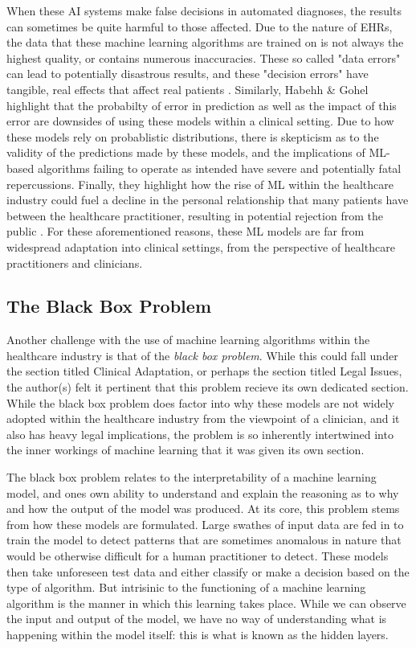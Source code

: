 \documentclass[a4paper]{article}
\begin{document}
When these AI systems make false decisions in automated diagnoses, the results can sometimes be quite harmful to those affected. Due to the nature of EHRs, the data that these machine learning algorithms are trained on is not always the highest quality, or contains numerous inaccuracies. These so called "data errors" can lead to potentially disastrous results, and these "decision errors" have tangible, real effects that affect real patients \cite{Ali_2023}. Similarly, Habehh \& Gohel highlight that the probabilty of error in prediction as well as the impact of this error are downsides of using these models within a clinical setting. Due to how these models rely on probablistic distributions, there is skepticism as to the validity of the predictions made by these models, and the implications of ML-based algorithms failing to operate as intended have severe and potentially fatal repercussions. Finally, they highlight how the rise of ML within the healthcare industry could fuel a decline in the personal relationship that many patients have between the healthcare practitioner, resulting in potential rejection from the public \cite{Habehh_2021}. For these aforementioned reasons, these ML models are far from widespread adaptation into clinical settings, from the perspective of healthcare practitioners and clinicians. 

\subsection{The Black Box Problem}

Another challenge with the use of machine learning algorithms within the healthcare industry is that of the \textit{black box problem}. While this could fall under the section titled Clinical Adaptation, or perhaps the section titled Legal Issues, the author(s) felt it pertinent that this problem recieve its own dedicated section. While the black box problem does factor into why these models are not widely adopted within the healthcare industry from the viewpoint of a clinician, and it also has heavy legal implications, the problem is so inherently intertwined into the inner workings of machine learning that it was given its own section. 

The black box problem relates to the interpretability of a machine learning model, and ones own ability to understand and explain the reasoning as to why and how the output of the model was produced. At its core, this problem stems from how these models are formulated. Large swathes of input data are fed in to train the model to detect patterns that are sometimes anomalous in nature that would be otherwise difficult for a human practitioner to detect. These models then take unforeseen test data and either classify or make a decision based on the type of algorithm. But intrisinic to the functioning of a machine learning algorithm is the manner in which this learning takes place. While we can observe the input and output of the model, we have no way of understanding what is happening within the model itself: this is what is known as the hidden layers. 
\end{document}
